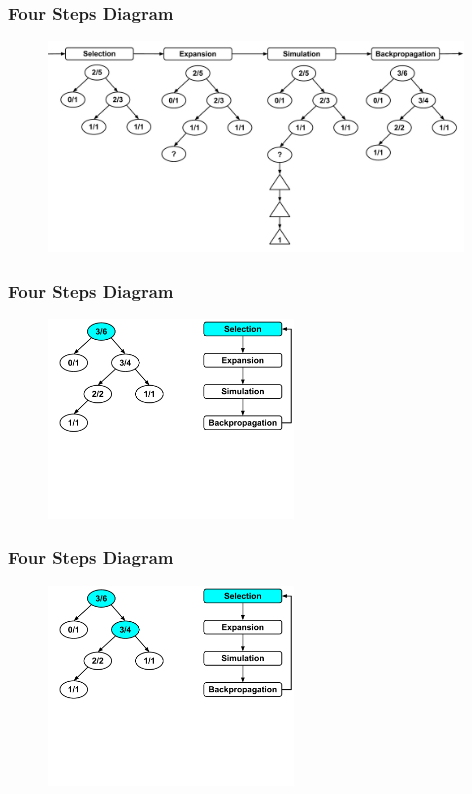 \documentclass{beamer}
\begin{document}
\begin{frame}[fragile]
\frametitle{Four Steps Diagram}
\begin{figure}[h]
	\includegraphics[width=11cm]{Diagrams/FourSteps/MCTSFourStepProcessWhole.pdf}
	\centering
\end{figure}
\end{frame}



\begin{frame}[fragile]
\frametitle{Four Steps Diagram}
\begin{figure}[h]
	\includegraphics[width=6.5cm]{Diagrams/MCTSShort/MCTSShortOneOneOne.pdf}
	\centering
\end{figure}
\end{frame}


\begin{frame}[fragile]
\frametitle{Four Steps Diagram}
\begin{figure}[h]
	\includegraphics[width=6.5cm]{Diagrams/MCTSShort/MCTSShortOneOneTwo.pdf}
	\centering
\end{figure}
\end{frame}
\end{document}
